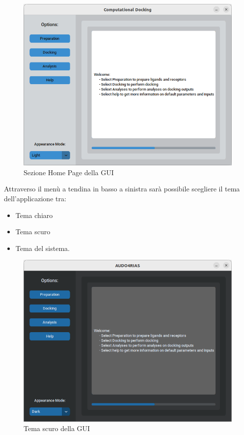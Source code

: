 \begin{figure}[H]
    \centering
    \includegraphics[scale=0.6]{immagini/capitolo3/homePage.png}
    \caption{Sezione Home Page della GUI}
    \label{fig:home page}
\end{figure}

Attraverso il menù a tendina in basso a sinistra sarà possibile scegliere il tema dell'applicazione tra:

\begin{itemize}
    \item Tema chiaro
    \item Tema scuro
    \item Tema del sistema.
\end{itemize}

\begin{figure}[H]
    \centering
    \includegraphics[scale=0.6]{immagini/capitolo3/darkGUI.png}
    \caption{Tema scuro della GUI}
    \label{fig:dark GUI}
\end{figure}

